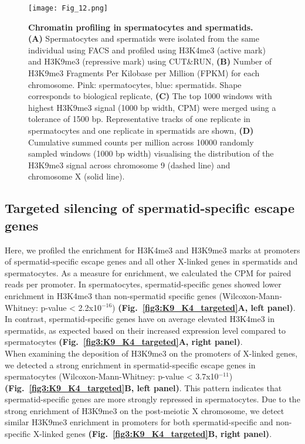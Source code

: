 \begin{figure}[!h]
\centering
\texttt{[image: Fig\_12.png]}
\caption[Chromatin profiling in spermatocytes and spermatids]{\textbf{Chromatin profiling in spermatocytes and spermatids.} \\
\textbf{(A)} Spermatocytes and spermatids were isolated from the same individual using FACS and profiled using H3K4me3 (active mark) and H3K9me3 (repressive mark) using CUT\&{}RUN, \textbf{(B)} Number of H3K9me3 Fragments Per Kilobase per Million (FPKM) for each chromosome. Pink: spermatocytes, blue: spermatids. Shape corresponds to biological replicate, \textbf{(C)} The top 1000 windows with highest H3K9me3 signal (1000 bp width, CPM) were merged using a tolerance of 1500 bp. Representative tracks of one replicate in spermatocytes and one replicate in spermatids are shown, \textbf{(D)} Cumulative summed counts per million across 10000 randomly sampled windows (1000 bp width) visualising the distribution of the H3K9me3 signal across chromosome 9 (dashed line) and chromosome X (solid line).}
\label{fig3:K9_global}
\end{figure}

\newpage

\subsection{Targeted silencing of spermatid-specific escape genes}

Here, we profiled the enrichment for H3K4me3 and H3K9me3 marks at promoters of spermatid-specific escape genes and all other X-linked genes in spermatids and spermatocytes. As a measure for enrichment, we calculated the \gls{CPM} for paired reads per promoter. In spermatocytes, spermatid-specific genes showed lower enrichment in H3K4me3 than non-spermatid specific genes (Wilcoxon-Mann-Whitney: p-value < 2.2x10$^{-16}$) \textbf{(Fig.~\ref{fig3:K9_K4_targeted}A, left panel)}. In contrast, spermatid-specific genes have on average elevated H3K4me3 in spermatids, as expected based on their increased expression level compared to spermatocytes \textbf{(Fig.~\ref{fig3:K9_K4_targeted}A, right panel)}. \\


When examining the deposition of H3K9me3 on the promoters of X-linked genes, we detected a strong enrichment in spermatid-specific escape genes in spermatocytes (Wilcoxon-Mann-Whitney: p-value < 3.7x10$^{-11}$) \textbf{(Fig.~\ref{fig3:K9_K4_targeted}B, left panel)}. This pattern indicates that spermatid-specific genes are more strongly repressed in spermatocytes. Due to the strong enrichment of H3K9me3 on the post-meiotic X chromosome, we detect similar H3K9me3 enrichment in promoters for both spermatid-specific and non-specific X-linked genes \textbf{(Fig.~\ref{fig3:K9_K4_targeted}B, right panel)}.\\

